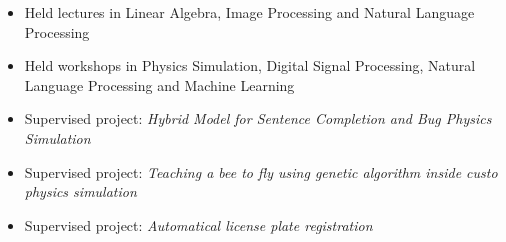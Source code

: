 













\begin{itemize}
    \item   \small{Held lectures in Linear Algebra, Image Processing and Natural Language Processing}
    \item   \small{Held workshops in Physics Simulation, Digital Signal Processing, Natural Language Processing and Machine Learning}
    \item   \small{Supervised project: \textit{Hybrid Model for Sentence Completion and Bug Physics Simulation}}
    \item   \small{Supervised project: \textit{Teaching a bee to fly using genetic algorithm inside custo physics simulation}}
    \item   \small{Supervised project: \textit{Automatical license plate registration}}
    \\
\end{itemize}

